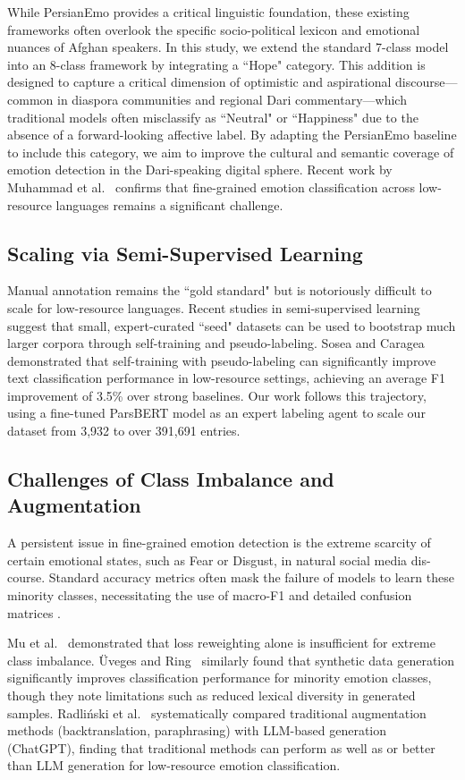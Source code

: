 \documentclass[runningheads]{llncs}
\begin{document}
While PersianEmo provides a critical linguistic foundation, these existing frameworks often overlook the specific socio-political lexicon and emotional nuances of Afghan speakers. In this study, we extend the standard 7-class model into an 8-class framework by integrating a ``Hope" category. This addition is designed to capture a critical dimension of optimistic and aspirational discourse—common in diaspora communities and regional Dari commentary—which traditional models often misclassify as ``Neutral" or ``Happiness" due to the absence of a forward-looking affective label. By adapting the PersianEmo baseline to include this category, we aim to improve the cultural and semantic coverage of emotion detection in the Dari-speaking digital sphere.
Recent work by Muhammad et al.~\cite{muhammad2025brighter} confirms 
that fine-grained emotion classification across low-resource languages 
remains a significant challenge.


\subsection{ Scaling via Semi-Supervised Learning}
Manual annotation remains the ``gold standard" but is notoriously difficult to scale for low-resource languages. Recent studies in semi-supervised learning suggest that small, expert-curated ``seed" datasets can be used to bootstrap much larger corpora through self-training and pseudo-labeling. Sosea and Caragea~\cite{sosea2022leveraging} demonstrated that self-training with pseudo-labeling can significantly improve text classification performance in low-resource settings, achieving an average F1 improvement of 3.5\% over strong baselines. Our work follows this trajectory, using a fine-tuned ParsBERT model as an expert labeling agent to scale our dataset from 3,932 to over 391,691 entries.
\subsection{Challenges of Class Imbalance and Augmentation}

A persistent issue in fine-grained emotion detection is the extreme scarcity of
certain emotional states, such as Fear or Disgust, in natural social media dis-
course. Standard accuracy metrics often mask the failure of models to learn
these minority classes, necessitating the use of macro-F1 and detailed confusion
matrices \cite{cui2025addressing}. 

Mu et al.~\cite{mu2025limitations} demonstrated that loss reweighting alone is insufficient
for extreme class imbalance. Üveges and Ring~\cite{uveges2025synthetic} similarly found that synthetic data
generation significantly improves classification performance for minority emotion classes, though they note limitations such as reduced lexical diversity in
generated samples. Radliński et al.~\cite{radlinski2025backtranslation} systematically compared traditional
augmentation methods (backtranslation, paraphrasing) with LLM-based generation (ChatGPT),
finding that traditional methods can perform as well as or better than LLM generation
for low-resource emotion classification.
\end{document}
